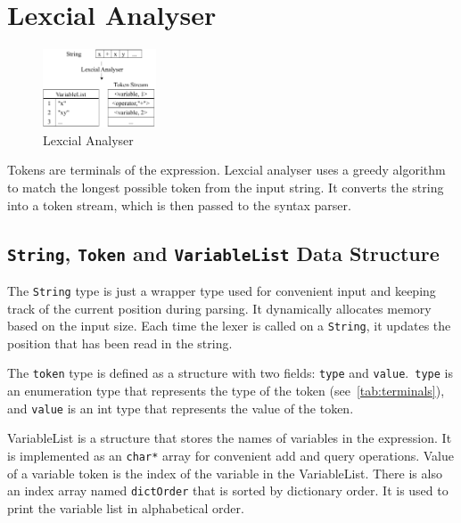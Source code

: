 \documentclass[a4paper,oneside]{book}
\begin{document}
\section{Lexcial Analyser}

\begin{figure}
    \caption{Lexcial Analyser}
    \centering
    \includegraphics[width=0.3\textwidth]{src/token_varlist.drawio.pdf}
\end{figure}

Tokens are terminals of the expression. Lexcial analyser uses a greedy algorithm to match the longest possible token from the input string. It converts the string into a token stream, which is then passed to the syntax parser.

\subsection{\texttt{String}, \texttt{Token} and \texttt{VariableList} Data Structure}

The \verb|String| type is just a wrapper type used for convenient input and keeping track of the current position during parsing. It dynamically allocates memory based on the input size. Each time the lexer is called on a \verb|String|, it updates the position that has been read in the string.

The \verb|token| type is defined as a structure with two fields: \verb|type| and \verb|value|.\ \verb|type| is an enumeration type that represents the type of the token (see~\ref{tab:terminals}), and \verb|value| is an int type that represents the value of the token.

VariableList is a structure that stores the names of variables in the expression. It is implemented as an \verb|char*| array for convenient add and query operations. Value of a variable token is the index of the variable in the VariableList. There is also an index array named \verb|dictOrder| that is sorted by dictionary order. It is used to print the variable list in alphabetical order.
\end{document}
